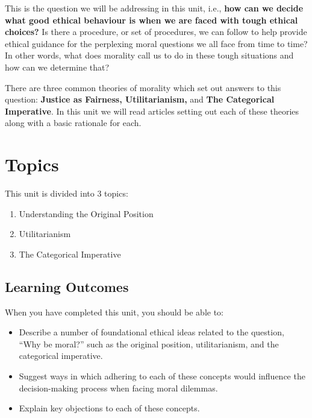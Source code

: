 \documentclass[
]{book}
\providecommand{\tightlist}{%
  \setlength{\itemsep}{0pt}\setlength{\parskip}{0pt}}
\begin{document}
This is the question we will be addressing in this unit, i.e., \textbf{how can we decide what good ethical behaviour is when we are faced with tough ethical choices?} Is there a procedure, or set of procedures, we can follow to help provide ethical guidance for the perplexing moral questions we all face from time to time? In other words, what does morality call us to do in these tough situations and how can we determine that?

There are three common theories of morality which set out answers to this question: \textbf{Justice as Fairness, Utilitarianism,} and \textbf{The Categorical Imperative}. In this unit we will read articles setting out each of these theories along with a basic rationale for each.

\hypertarget{topics-3}{%
\section*{Topics}\label{topics-3}}

This unit is divided into 3 topics:

\begin{enumerate}
\def\labelenumi{\arabic{enumi}.}
\tightlist
\item
  Understanding the Original Position\\
\item
  Utilitarianism\\
\item
  The Categorical Imperative
\end{enumerate}

\hypertarget{learning-outcomes-3}{%
\subsection*{Learning Outcomes}\label{learning-outcomes-3}}

When you have completed this unit, you should be able to:

\begin{itemize}
\tightlist
\item
  Describe a number of foundational ethical ideas related to the question, ``Why be moral?'' such as the original position, utilitarianism, and the categorical imperative.\\
\item
  Suggest ways in which adhering to each of these concepts would influence the decision-making process when facing moral dilemmas.\\
\item
  Explain key objections to each of these concepts.
\end{itemize}
\end{document}
